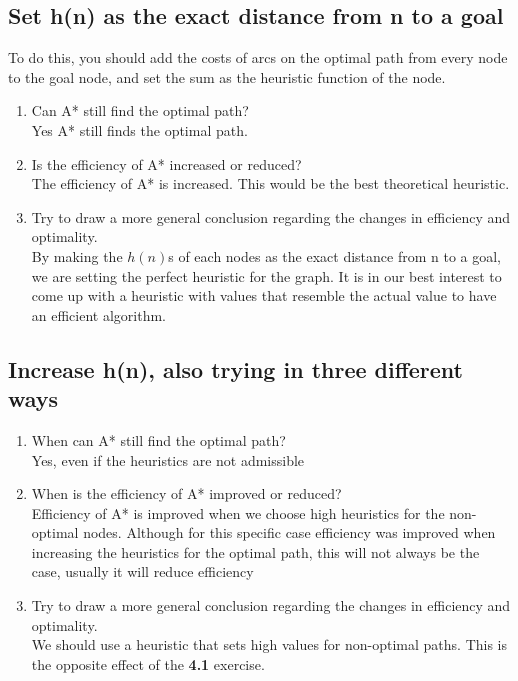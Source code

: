 \documentclass{article}
\def\ans#1{{\color{ans}#1}}
\begin{document}
\subsection{Set h(n) as the exact distance from n to a goal}
To do this, you should add the costs of arcs on the optimal path from every node to the goal node, and set the sum as the heuristic function of the node. 
\begin{enumerate}[label=(\alph*)]
    \item Can A* still find the optimal path? \\
    \ans{
        Yes A* still finds the optimal path.
    }
    \item Is the efficiency of A* increased or reduced? \\
    \ans{
        The efficiency of A* is increased. This would be the best theoretical heuristic.
    }
    \item Try to draw a more general conclusion regarding the changes in efficiency and optimality. \\
    \ans{
        By making the $h(n)$s of each nodes as the exact distance from n to a goal, we are setting the 
        perfect heuristic for the graph. It is in our best interest to come up with a heuristic with values that resemble the actual value to have an efficient algorithm.
    }
\end{enumerate}

\subsection{Increase h(n), also trying in three different ways}
\begin{enumerate}[label=(\alph*)]
    \item When can A* still find the optimal path? \\
    \ans{
        Yes, even if the heuristics are not admissible
    }
    \item When is the efficiency of A* improved or reduced? \\
    \ans{
        Efficiency of A* is improved when we choose high heuristics for the non-optimal nodes. Although for this specific case efficiency was improved when increasing the heuristics for the optimal path, this will not always be the case, usually it will reduce efficiency
    }
    \item Try to draw a more general conclusion regarding the changes in efficiency and optimality.\\
    \ans{
        We should use a heuristic that sets high values for non-optimal paths. This is the opposite effect of the \textbf{4.1} exercise.
    }
\end{enumerate}
\end{document}
